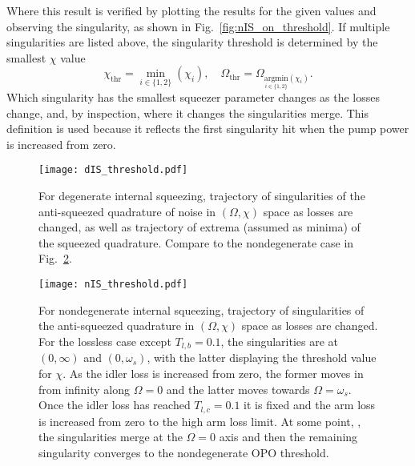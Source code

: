 \endgroup
Where this result is verified by plotting the results for the given values and observing the singularity, as shown in Fig.~\ref{fig:nIS_on_threshold}. If multiple singularities are listed above, the singularity threshold is determined by the smallest $\chi$ value $$\chi_\text{thr}=\min_{i\in\{1,2\}}(\chi_i),\quad\Omega_\text{thr}=\Omega_{\underset{i\in\{1,2\}}{\text{argmin}}(\chi_i)}.$$ Which singularity has the smallest squeezer parameter changes as the losses change, and, by inspection, where it changes the singularities merge. This definition is used because it reflects the first singularity hit when the pump power is increased from zero.

\begin{figure}
    \centering
    \texttt{[image: dIS\_threshold.pdf]}
    \caption{  For degenerate internal squeezing, trajectory of singularities of the anti-squeezed quadrature of noise in $(\Omega, \chi)$ space as losses are changed, as well as trajectory of extrema (assumed as minima) of the squeezed quadrature. Compare to the nondegenerate case in Fig.~\ref{fig:nIS_threshold_traj}. }
    \label{fig:dIS_threshold_traj}
\end{figure}
\begin{figure}
    \centering
    \texttt{[image: nIS\_threshold.pdf]}
    \caption{  For nondegenerate internal squeezing, trajectory of singularities of the anti-squeezed quadrature in $(\Omega, \chi)$ space as losses are changed. For the lossless case except $T_{l,b}=0.1$, the singularities are at $(0,\infty)$ and $(0,\omega_s)$, with the latter displaying the threshold value for $\chi$. As the idler loss is increased from zero, the former moves in from infinity along $\Omega=0$ and the latter moves towards $\Omega=\omega_s$. Once the idler loss has reached $T_{l,c}=0.1$  it is fixed and the arm loss is increased from zero to the high arm loss limit. At some point, , the singularities merge at the $\Omega=0$ axis and then the remaining singularity converges to the nondegenerate OPO threshold.}
    \label{fig:nIS_threshold_traj}
\end{figure}

